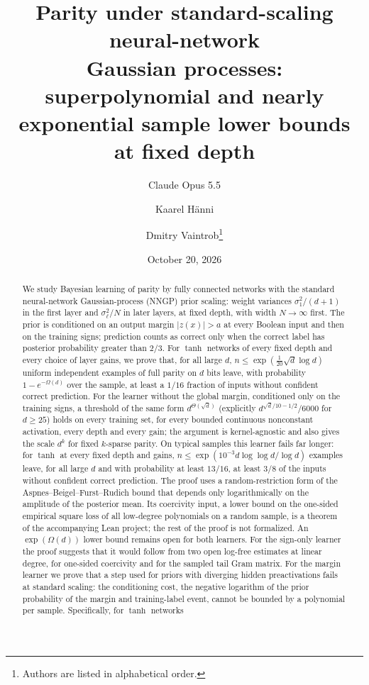 \documentclass[11pt]{article}
\title{Parity under standard-scaling neural-network\\Gaussian processes: superpolynomial and nearly\\exponential sample lower bounds at fixed depth}
\author{Claude Opus 5.5 \and Kaarel H\"anni \and Dmitry Vaintrob\thanks{Authors are listed in alphabetical order.}}
\date{October 20, 2026}
\theoremstyle{definition}\newtheorem{assumption}[theorem]{Assumption}
\theoremstyle{remark}\newtheorem{remark}[theorem]{Remark}
\begin{document}
\maketitle
\begin{abstract}
We study Bayesian learning of parity by fully connected networks with the
standard neural-network Gaussian-process (NNGP) prior scaling: weight
variances $\sigma_1^2/(d+1)$ in the first layer and $\sigma_\ell^2/N$ in
later layers, at fixed depth, with width $N\to\infty$ first. The prior is
conditioned on an output margin $|z(x)|>a$ at every Boolean input and then
on the training signs; prediction counts as correct only when the correct
label has posterior probability greater than $2/3$. For $\tanh$ networks
of every fixed depth and every choice of layer gains, we prove that, for all large $d$,
$n\le\exp(\frac1{20}\sqrt d\log d)$ uniform independent examples of full
parity on $d$ bits leave, with probability $1-e^{-\Omega(d)}$ over the
sample, at least a $1/16$ fraction of inputs without confident correct
prediction. For the learner without the global margin, conditioned only on
the training signs, a threshold of the same form $d^{\Theta(\sqrt d)}$
(explicitly $d^{\sqrt d/10-1/2}/6000$ for $d\ge25$) holds on every
training set, for every bounded continuous nonconstant activation, every
depth and every gain; the argument is kernel-agnostic and also gives the
scale $d^k$ for fixed $k$-sparse parity. On typical samples this learner
fails far longer: for $\tanh$ at every fixed depth and gains,
$n\le\exp(10^{-3}d\log\log d/\log d)$ examples leave, for all large $d$ and
with probability at least $13/16$, at least $3/8$ of the inputs without
confident correct prediction. The proof uses a random-restriction form of
the Aspnes--Beigel--Furst--Rudich bound that depends only logarithmically
on the amplitude of the posterior mean. Its coercivity input, a lower bound
on the one-sided empirical square loss of all low-degree polynomials on a
random sample, is a theorem of the accompanying Lean project; the rest of
the proof is not formalized. An $\exp(\Omega(d))$ lower bound remains
open for both learners. For the sign-only learner the proof suggests that
it would follow from two open log-free estimates at linear degree, for one-sided
coercivity and for the sampled tail Gram matrix. For the margin learner we
prove that a step used for priors with diverging hidden preactivations
fails at standard scaling: the conditioning cost, the negative logarithm
of the prior probability of the margin and training-label event, cannot
be bounded by a polynomial per sample. Specifically, for $\tanh$ networks

\end{abstract}
\end{document}
